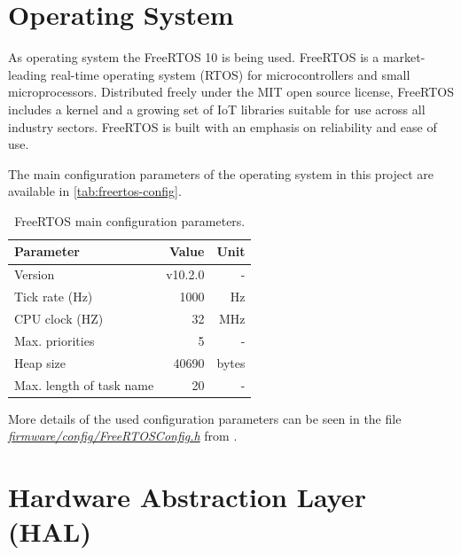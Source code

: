 
\section{Operating System}

As operating system the FreeRTOS 10 \cite{freertos} is being used. FreeRTOS is a market-leading real-time operating system (RTOS) for microcontrollers and small microprocessors. Distributed freely under the MIT open source license, FreeRTOS includes a kernel and a growing set of IoT libraries suitable for use across all industry sectors. FreeRTOS is built with an emphasis on reliability and ease of use.

The main configuration parameters of the operating system in this project are available in \autoref{tab:freertos-config}.

\begin{table}[!h]
    \centering
    \begin{tabular}{lrr}
        \toprule[1.5pt]
        \textbf{Parameter}       & \textbf{Value} & \textbf{Unit} \\
        \midrule
        Version                  & v10.2.0        & - \\
        Tick rate (Hz)           & 1000           & Hz \\
        CPU clock (HZ)           & 32             & MHz \\
        Max. priorities          & 5              & - \\
        Heap size                & 40690          & bytes \\
        Max. length of task name & 20             & - \\
        \bottomrule[1.5pt]
    \end{tabular}
    \caption{FreeRTOS main configuration parameters.}
    \label{tab:freertos-config}
\end{table}

More details of the used configuration parameters can be seen in the file \textit{\href{https://github.com/spacelab-ufsc/eps2/blob/master/firmware/config/FreeRTOSConfig.h}{firmware/config/FreeRTOSConfig.h}} from \cite{eps2}.

\section{Hardware Abstraction Layer (HAL)}

